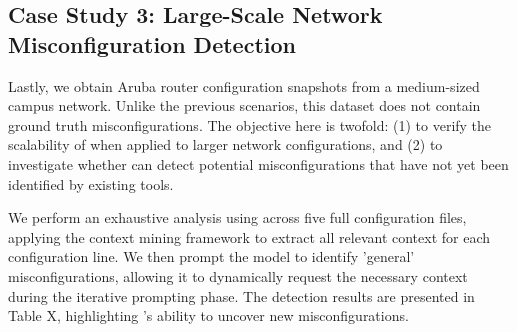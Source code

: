 \subsection{Case Study 3: Large-Scale Network Misconfiguration Detection}
Lastly, we obtain Aruba router configuration snapshots from a medium-sized campus network. Unlike the previous scenarios, this dataset does not contain ground truth misconfigurations. The objective here is twofold: (1) to verify the scalability of \sysname{} when applied to larger network configurations, and (2) to investigate whether \sysname{} can detect potential misconfigurations that have not yet been identified by existing tools.

We perform an exhaustive analysis using \sysname{} across five full configuration files, applying the context mining framework to extract all relevant context for each configuration line. We then prompt the model to identify 'general' misconfigurations, allowing it to dynamically request the necessary context during the iterative prompting phase. The detection results are presented in Table X, highlighting \sysname{}'s ability to uncover new misconfigurations.
